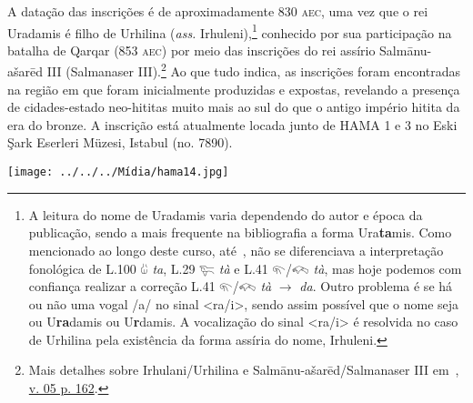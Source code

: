 \documentclass[article]{luvita}
\begin{document}
A datação das inscrições é de aproximadamente 830 \textsc{aec}, uma vez que
o rei
Uradamis é filho de Urhilina (\emph{ass.} Irhuleni),\footnote{
	A leitura do nome de Uradamis varia dependendo do autor e
	época da publicação, sendo a mais frequente na bibliografia a forma
	Ura\textbf{ta}mis.
	Como mencionado ao longo deste curso, até~\citet{Rieken2008}, não se
	diferenciava a interpretação fonológica de
	L.100 𔑰 \emph{ta}, L.29 𔐞 \emph{tà} e L.41 𔐬\slash{}𔐫 \emph{tà}, mas hoje
	podemos com confiança realizar a correção L.41 𔐬\slash{}𔐫 \emph{tà}
	$\rightarrow$ \emph{da}. Outro problema é se há ou não uma vogal /a/ no sinal
	<ra\slash{}i>, sendo assim possível que o nome seja ou U\textbf{ra}damis ou
	U\textbf{r}damis.
	A vocalização do sinal <ra\slash{}i> é resolvida no caso de Urhilina pela
	existência da forma assíria do nome, Irhuleni.
} conhecido por sua
participação na batalha de Qarqar (853 \textsc{aec}) por meio das inscrições
do rei assírio Salmānu-ašarēd III (Salmanaser III).\footnote{Mais detalhes
	sobre Irhulani\slash{}Urhilina e Salmānu-ašarēd\slash{}Salmanaser III
	em~,
	\href{https://publikationen.badw.de/en/rla/index\#5833}{v. 05 p. 162}.
}
Ao que tudo indica, as inscrições foram encontradas na região em que foram
inicialmente produzidas e expostas, revelando a presença de cidades-estado
neo-hititas muito mais ao sul do que o antigo império hitita da era do bronze.
A inscrição está atualmente locada junto de HAMA 1 e 3 no Eski Şark Eserleri
Müzesi, Istabul (no. 7890).

\clearpage%

\begin{center}
	\texttt{[image: ../../../Mídia/hama14.jpg]}
\end{center}
\end{document}
